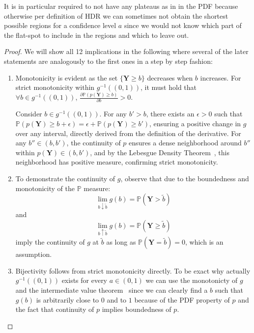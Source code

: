 It is in particular required to not have any plateaus as in in  the PDF because otherwise per definition of HDR we can sometimes not obtain the shortest possible regions for a confidence level $a$ since we would not know which part of the flat-spot to include in the regions and which to leave out.

\begin{proof}

    We will show all 12 implications in the following where several of the later statements are analogously to the first ones in a step by step fashion:
    \begin{enumerate}
        \item\label{item:monotonicity} Monotonicity is evident as the set \(\{\mathbf{Y} \geq b\}\) decreases when \(b\) increases. For strict monotonicity within \(g^{-1}((0,1))\), it must hold that \(\forall b \in g^{-1}((0,1))\), \(\frac{\partial \mathbb{P}(p(\mathbf{Y}) \geq b)}{\partial b} > 0\).

        Consider \(b \in g^{-1}((0,1))\). For any \(b' > b\), there exists an \(\epsilon > 0\) such that \(\mathbb{P}(p(\mathbf{Y}) \geq b + \epsilon) = \epsilon + \mathbb{P}(p(\mathbf{Y}) \geq b')\), ensuring a positive change in \(g\) over any interval, directly derived from the definition of the derivative. For any \(b'' \in (b, b')\), the continuity of \(p\) ensures a dense neighborhood around \(b''\) within \(p(\mathbf{Y}) \in (b, b')\), and by the Lebesgue Density Theorem~\cite{mattila1999geometry}, this neighborhood has positive measure, confirming strict monotonicity.

        \item\label{item:continuity} To demonstrate the continuity of \(g\), observe that due to the boundedness and monotonicity of the \(\mathbb{P}\) measure:
        \begin{equation}
            \lim_{b \downarrow \tilde{b}} g(b) = \mathbb{P}(\mathbf{Y} > \tilde{b})
        \end{equation}
        and
        \begin{equation}
            \lim_{b \uparrow \tilde{b}} g(b) = \mathbb{P}(\mathbf{Y} \geq \tilde{b})
        \end{equation}
        imply the continuity of \(g\) at \(\tilde{b}\) as long as \(\mathbb{P}(\mathbf{Y} = \tilde{b}) = 0\), which is an assumption.

        \item\label{item:bijectivity} Bijectivity follows from strict monotonicity directly. To be exact why actually $g^{-1}((0,1))$ exists for every $a \in (0,1)$ we can use the monotonicty of $g$ and the intermediate value theorem~\cite{russ1980translation} since we can clearly find a $b$ such that $g(b)$ is arbitrarily close to $0$ and to $1$ because of the PDF property of $p$ and the fact that continuity of $p$ implies boundedness of $p$.


\end{enumerate}
\end{proof}
